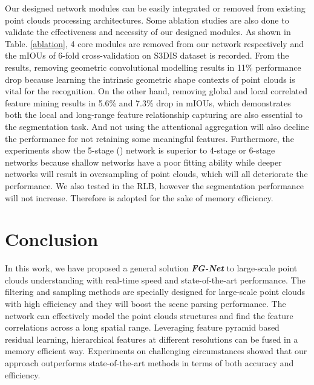 \documentclass[journal]{IEEEtran}
\begin{document}
Our designed network modules can be easily integrated or removed from existing point clouds processing architectures. Some ablation studies are also done to validate the effectiveness and necessity of our designed modules. As shown in Table. \ref{ablation}, 4 core modules are removed from our network respectively and the mIOUs of 6-fold cross-validation on S3DIS dataset is recorded. From the results, removing geometric convolutional modelling results in 11\% performance drop because learning the intrinsic geometric shape contexts of point clouds is vital for the recognition. On the other hand, removing global and local correlated feature mining results in 5.6\% and 7.3\% drop in mIOUs, which demonstrates both the local and long-range feature relationship capturing are also essential to the segmentation task. And not using the attentional aggregation will also decline the performance for not retaining some meaningful features. Furthermore, the experiments show the 5-stage () network is superior to 4-stage or 6-stage networks because shallow networks have a poor fitting ability while deeper networks will result in oversampling of point clouds, which will all deteriorate the performance. We also tested  in the RLB, however the segmentation performance will not increase. Therefore  is adopted for the sake of memory efficiency.































\section{Conclusion}
In this work, we have proposed a general solution \textit{\textbf{FG-Net}} to large-scale point clouds understanding with real-time speed and state-of-the-art performance. The filtering and sampling methods are specially designed for large-scale point clouds with high efficiency and they will boost the scene parsing performance. The network can effectively model the point clouds structures and find the feature correlations across a long spatial range. Leveraging feature pyramid based residual learning, hierarchical features at different resolutions can be fused in a memory efficient way. Experiments on challenging circumstances showed that our approach outperforms state-of-the-art methods in terms of both accuracy and efficiency.  
\end{document}
